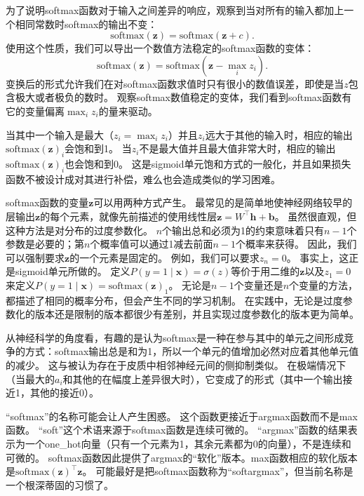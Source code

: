 
为了说明softmax函数对于输入之间差异的响应，观察到当对所有的输入都加上一个相同常数时softmax的输出不变：
\begin{equation}
\text{softmax}(\bm{z}) = \text{softmax}(\bm{z}+c).
\end{equation}
使用这个性质，我们可以导出一个数值方法稳定的softmax函数的变体：
\begin{equation}
\text{softmax}(\bm{z}) = \text{softmax}(\bm{z}- \max_i z_i).
\end{equation}
变换后的形式允许我们在对softmax函数求值时只有很小的数值误差，即使是当$z$包含极大或者极负的数时。
观察softmax数值稳定的变体，我们看到softmax函数有它的变量偏离$\max_i z_i$的量来驱动。

当其中一个输入是最大（$z_i = \max_i z_i$）并且$z_i$远大于其他的输入时，相应的输出$\text{softmax}(\bm{z})_i$会饱和到1。
当$z_i$不是最大值并且最大值非常大时，相应的输出$\text{softmax}(\bm{z})_i$也会饱和到0。
这是sigmoid单元饱和方式的一般化，并且如果损失函数不被设计成对其进行补偿，难么也会造成类似的学习困难。

softmax函数的变量$\bm{z}$可以用两种方式产生。
最常见的是简单地使神经网络较早的层输出$\bm{z}$的每个元素，就像先前描述的使用线性层$\bm{z}={W}^\top\bm{h}+\bm{b}$。
虽然很直观，但这种方法是对分布的过度参数化。
$n$个输出总和必须为1的约束意味着只有$n-1$个参数是必要的；第$n$个概率值可以通过1减去前面$n-1$个概率来获得。
因此，我们可以强制要求$\bm{z}$的一个元素是固定的。
例如，我们可以要求$z_n=0$。
事实上，这正是sigmoid单元所做的。
定义$P(y=1\mid\bm{x})=\sigma(z)$等价于用二维的$\bm{z}$以及$z_1=0$来定义$P(y=1\mid\bm{x})=\text{softmax}(\bm{z})_1$。
无论是$n-1$个变量还是$n$个变量的方法，都描述了相同的概率分布，但会产生不同的学习机制。
在实践中，无论是过度参数化的版本还是限制的版本都很少有差别，并且实现过度参数化的版本更为简单。

从神经科学的角度看，有趣的是认为softmax是一种在参与其中的单元之间形成竞争的方式：softmax输出总是和为1，所以一个单元的值增加必然对应着其他单元值的减少。
这与被认为存在于皮质中相邻神经元间的侧抑制类似。
在极端情况下（当最大的$a_i$和其他的在幅度上差异很大时），它变成了的形式（其中一个输出接近1，其他的接近0）。

``softmax''的名称可能会让人产生困惑。
这个函数更接近于argmax函数而不是max函数。
``soft''这个术语来源于softmax函数是连续可微的。
``argmax''函数的结果表示为一个\gls{one_hot}向量（只有一个元素为1，其余元素都为0的向量），不是连续和可微的。
softmax函数因此提供了argmax的``软化''版本。max函数相应的软化版本是$\text{softmax}(\bm{z})^\top \bm{z}$。
可能最好是把softmax函数称为``softargmax''，但当前名称是一个根深蒂固的习惯了。

